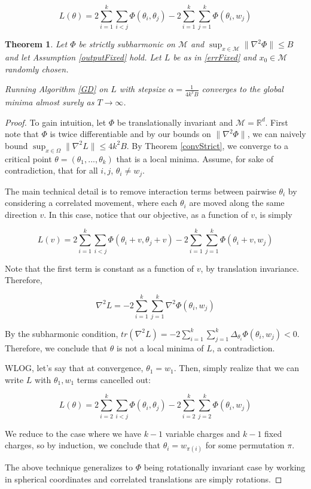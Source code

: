 \documentclass[11pt]{article}
\newtheorem{theorem}{Theorem}[section]
\newcommand{\R}{{\mathbb{R}}}
\begin{document}
\begin{equation}\label{errFixed}
L(\theta) =  2\sum_{i=1}^k\sum_{i < j} \Phi(\theta_i,\theta_j) - 2\sum_{i=1}^k\sum_{j=1}^k\Phi(\theta_i,w_j)
\end{equation}


\begin{theorem}
Let $\Phi$ be strictly subharmonic on $\mathcal{M}$ and $\sup_{x \in \mathcal{M}} \|\nabla^2 \Phi\|\leq B$ and let Assumption \ref{outputFixed} hold. Let $L$ be as in \eqref{errFixed} and $x_0 \in \mathcal{M}$ randomly chosen. 

Running Algorithm \ref{GD} on $L$ with stepsize $\alpha = \frac{1}{4k^2B}$ converges to the global minima almost surely as $T\to\infty$.
\end{theorem}

\begin{proof}
To gain intuition, let $\Phi$ be translationally invariant and $\mathcal{M} = \R^d$. First note that $\Phi$ is twice differentiable and by our bounds on $\|\nabla^2\Phi\|$, we can naively bound $\sup_{x\in\Omega}\|\nabla^2L\|\leq 4k^2B$. By Theorem \ref{convStrict}, we converge to a critical point $\theta = (\theta_1,...,\theta_k)$ that is a local minima. Assume, for sake of contradiction, that for all $i, j$, $\theta_i \neq w_j$. 

The main technical detail is to remove interaction terms between pairwise $\theta_i$ by considering a correlated movement, where each $\theta_i$ are moved along the same direction $v$. In this case, notice that our objective, as a function of $v$, is simply

\[L(v) =  2\sum_{i=1}^k\sum_{i < j} \Phi(\theta_i+v,\theta_j+v) - 2\sum_{i=1}^k\sum_{j=1}^k \Phi(\theta_i+v,w_j)
 \]

Note that the first term is constant as a function of $v$, by translation invariance. Therefore,

\[\nabla^2 L = -2\sum_{i=1}^k \sum_{j=1}^k \nabla^2\Phi(\theta_i, w_j)\]

By the subharmonic condition, $tr(\nabla^2L) = -2\sum_{i=1}^k\sum_{j=1}^k \Delta_{\theta_i}\Phi(\theta_i,w_j) < 0$. Therefore, we conclude that $\theta$ is not a local minima of $L$, a contradiction.

WLOG, let's say that at convergence, $\theta_1 = w_1$. Then, simply realize that we can write $L$ with $\theta_1,w_1$ terms cancelled out:

\[L(\theta) =  2\sum_{i=2}^k\sum_{i < j} \Phi(\theta_i,\theta_j) - 2\sum_{i=2}^k\sum_{j=2}^k\Phi(\theta_i,w_j) \]

We reduce to the case where we have $k-1$ variable charges and $k-1$ fixed charges, so by induction, we conclude that $\theta_i = w_{\pi(i)}$ for some permutation $\pi$.

The above technique generalizes to $\Phi$ being rotationally invariant case by working in spherical coordinates and correlated translations are simply rotations. 
\end{proof}
\end{document}
